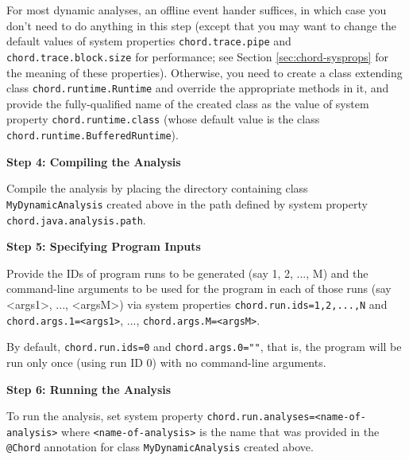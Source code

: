 For most dynamic analyses, an offline event hander suffices, in which case you don't need to do
anything in this step (except that you may want to change the default values of system properties
\verb+chord.trace.pipe+ and \verb+chord.trace.block.size+ for performance; see
Section \ref{sec:chord-sysprops} for the meaning of these properties). Otherwise, you need to
create a class extending class \verb+chord.runtime.Runtime+ and override the appropriate methods
in it, and provide the fully-qualified name of the created class as the value of system property
\verb+chord.runtime.class+ (whose default value is the class \verb+chord.runtime.BufferedRuntime+).

{\bf Step 4: Compiling the Analysis}

Compile the analysis by placing the directory containing class \verb+MyDynamicAnalysis+ created
above in the path defined by system property \verb+chord.java.analysis.path+.

{\bf Step 5: Specifying Program Inputs}

Provide the IDs of program runs to be generated (say 1, 2, ..., M) and the command-line arguments to be
used for the program in each of those runs (say <args1>, ..., <argsM>) via system properties
\verb+chord.run.ids=1,2,...,N+ and \verb+chord.args.1=<args1>+, ..., \verb+chord.args.M=<argsM>+.

By default, \verb+chord.run.ids=0+ and \verb+chord.args.0=""+, that is, the program will be run only
once (using run ID 0) with no command-line arguments.

{\bf Step 6: Running the Analysis}

To run the analysis, set system property \verb+chord.run.analyses=<name-of-analysis>+ where
\verb+<name-of-analysis>+ is the name that was provided in the \verb+@Chord+ annotation for class
\verb+MyDynamicAnalysis+ created above.
